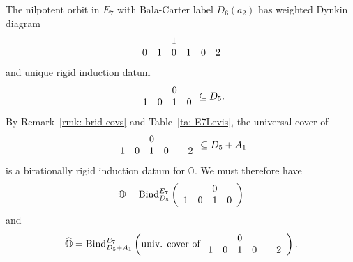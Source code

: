 \documentclass[11pt]{amsart}
\renewcommand{\O}{{\mathbb O}}
\newcommand{\bZ}{{\mathbb Z}}
\newcommand{\BInd}{{{\mbox{\rm Bind}}}}
\newcommand{\hatO}{\widehat{\O}}
\numberwithin{equation}{section}
\begin{document}
	The nilpotent orbit in $E_7$ with Bala-Carter label $D_6(a_2)$ has weighted Dynkin diagram $$\begin{array}{c c c c c c}
		& & 1 & & & \\
		0 & 1 & 0 & 1 & 0 & 2 \\
	\end{array}$$ and unique rigid induction datum
	$$\begin{array}{c c c c}
		& & 0 & \\
		1 & 0 & 1 & 0 \\
	\end{array}\subseteq D_5.$$ By Remark~\ref{rmk: brid covs} and Table~\ref{ta: E7Levis}, the universal cover of $$\begin{array}{c c c c c c}
		& & 0 & & & \\
		1 & 0 & 1 & 0 & & 2 \\
	\end{array}\subseteq D_5+A_1$$ is a birationally rigid induction datum for $\O$. We must therefore have
	$$\O = \BInd_{D_5}^{E_7}\left(\begin{array}{c c c c}
		& & 0 & \\
		1 & 0 & 1 & 0 \\
	\end{array} \right)$$
	and
	$$\hatO = \BInd_{D_5+ A_1}^{E_7}\left( \mbox{univ. cover of }\begin{array}{c c c c c c}
		& & 0 & & & \\
		1 & 0 & 1 & 0 & & 2 \\
	\end{array} \right).$$
	

	
\end{document}
